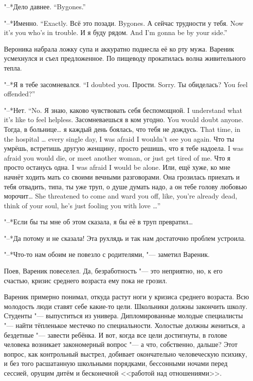 {"--*Дело давнее.}
{``Bygones.''}

{"--*Именно.}
{``Exactly.}
{Всё это позади.}
{Bygones.}
{А сейчас трудности у тебя.}
{Now it's you who's in trouble.}
{И я буду рядом.}
{And I'm gonna be by your side.''}

Вероника набрала ложку супа и аккуратно поднесла её ко рту мужа.
Вареник усмехнулся и съел предложенное.
По пищеводу прокатилась волна живительного тепла.

{"--*Я в тебе засомневался.}
{``I doubted you.}
{Прости.}
{Sorry.}
{Ты обиделась?}
{You feel offended?''}

{"--*Нет.}
{``No.}
{Я знаю, каково чувствовать себя беспомощной.}
{I understand what it's like to feel helpless.}
{Засомневаешься в ком угодно.}
{You would doubt anyone.}
{Тогда, в больнице\ldots{} я каждый день боялась, что тебя не дождусь.}
{That time, in the hospital \ldots{} every single day, I was afraid I wouldn't see you again.}
{Что ты умрёшь, встретишь другую женщину, просто решишь, что я тебе надоела.}
{I was afraid you would die, or meet another woman, or just get tired of me.}
{Что я просто останусь одна.}
{I was afraid I would be alone.}
Или, ещё хуже, ко мне начнёт ходить мать со своими вечными разговорами.
{Она грозилась приехать и тебя отвадить, типа, ты уже труп, о душе думать надо, а он тебе голову любовью морочит\ldots{}}
{She threatened to come and ward you off, like, you're already dead, think of your soul, he's just fooling you with love \ldots{}''}

"--*Если бы ты мне об этом сказала, я бы её в труп превратил\ldots{}

"--*Да потому и не сказала!
Эта рухлядь и так нам достаточно проблем устроила.

"--*Что-то нам обоим не повезло с родителями, "--- заметил Вареник.

Поев, Вареник повеселел.
Да, безработность "--- это неприятно, но, к его счастью, кризис среднего возраста ему пока не грозил.

Вареник примерно понимал, откуда растут ноги у кризиса среднего возраста.
Всю молодость люди ставят себе какие-то цели.
Школьники должны закончить школу.
Студенты "--- выпуститься из универа.
Дипломированные молодые специалисты "--- найти тёпленькое местечко по специальности.
Холостые должны жениться, а бездетные "--- завести ребёнка.
И вот, когда все цели достигнуты, в голове человека возникает закономерный вопрос "--- а что, собственно, дальше?
Этот вопрос, как контрольный выстрел, добивает окончательно человеческую психику, и без того расшатанную школьными порядками, бессонными ночами перед сессией, орущим дитём и бесконечной <<работой над отношениями>>.

